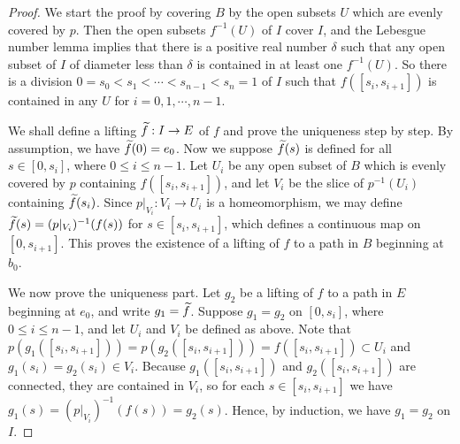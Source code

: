 \begin{proof}
    We start the proof by covering $B$ by the open subsets $U$ which are evenly covered by $p$.
    Then the open subsets $f^{-1}(U)$ of $I$ cover $I$, and the Lebesgue number lemma implies that there is a positive real number $\delta$ such that any open subset of $I$ of diameter less than $\delta$ is contained in at least one $f^{-1}(U)$.
    So there is a division $0=s_0<s_1<\cdots<s_{n-1}<s_n=1$ of $I$ such that $f([s_i, s_{i+1}])$ is contained in any $U$ for $i=0, 1, \cdots, n-1$.

    We shall define a lifting $\widetilde{f}: I\rightarrow E$ of $f$ and prove the uniqueness step by step.
    By assumption, we have $\widetilde{f}(0)=e_0$.
    Now we suppose $\widetilde{f}(s)$ is defined for all $s\in[0, s_i]$, where $0\leq i\leq n-1$.
    Let $U_i$ be any open subset of $B$ which is evenly covered by $p$ containing $f([s_i, s_{i+1}])$, and let $V_i$ be the slice of $p^{-1}(U_i)$ containing $\widetilde{f}(s_i)$.
    Since $p|_{V_i}: V_i\rightarrow U_i$ is a homeomorphism, we may define $\widetilde{f}(s)=(p|_{V_i})^{-1}(f(s))$ for $s\in[s_i, s_{i+1}]$, which defines a continuous map on $[0, s_{i+1}]$.
    This proves the existence of a lifting of $f$ to a path in $B$ beginning at $b_0$.

    We now prove the uniqueness part.
    Let $g_2$ be a lifting of $f$ to a path in $E$ beginning at $e_0$, and write $g_1=\widetilde{f}$.
    Suppose $g_1=g_2$ on $[0, s_i]$, where $0\leq i\leq n-1$, and let $U_i$ and $V_i$ be defined as above.
    Note that $p(g_1([s_i, s_{i+1}]))=p(g_2([s_i, s_{i+1}]))=f([s_i, s_{i+1}])\subset U_i$ and $g_1(s_i)=g_2(s_i)\in V_i$.
    Because $g_1([s_i, s_{i+1}])$ and $g_2([s_i, s_{i+1}])$ are connected, they are contained in $V_i$, so for each $s\in [s_i, s_{i+1}]$ we have $g_1(s)=(p|_{V_i})^{-1}(f(s))=g_2(s)$.
    Hence, by induction, we have $g_1=g_2$ on $I$.
\end{proof}

